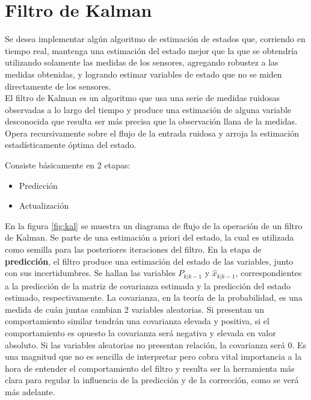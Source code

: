 \documentclass[main]{subfiles}
\begin{document}
\chapter{Filtro de Kalman}
\label{chap:kalman}

Se desea implementar algún algoritmo de estimación de estados que, corriendo en tiempo real, mantenga una estimación del estado mejor que la que se obtendría utilizando solamente las medidas de los sensores, agregando robustez a las medidas obtenidas, y logrando estimar variables de estado que no se miden directamente de los sensores.\\

El filtro de Kalman es un algoritmo que usa una serie de medidas ruidosas observadas a lo largo del tiempo y produce una estimación de alguna variable desconocida que resulta ser más precisa que la observación llana de la medidas. Opera recursivamente sobre el flujo de la entrada ruidosa y arroja la estimación estadísticamente óptima del estado.

Consiste básicamente en 2 etapas:
\begin{itemize}
  \item Predicción
  \item Actualización
\end{itemize}

En la figura \ref{fig:kal} se muestra un diagrama de flujo de la operación de un filtro de Kalman. Se parte de una estimación a priori del estado, la cual es utilizada como semilla para las posteriores iteraciones del filtro. En la etapa de \textbf{predicción}, el filtro produce una estimación del estado de las variables, junto con sus incertidumbres. Se hallan las variables $P_{k|k-1}$ y $\hat{x}_{k|k-1}$, correspondientes a la predicción de la matriz de covarianza estimada y la predicción del estado estimado, respectivamente. La covarianza, en la teoría de la probabilidad, es una medida de cuán juntas cambian 2 variables aleatorias. Si presentan un comportamiento similar tendrán una covarianza elevada y positiva, si el comportamiento es opuesto la covarianza será negativa y elevada en valor absoluto. Si las variables aleatorias no presentan relación, la covarianza será 0. Es una magnitud que no es sencilla de interpretar pero cobra vital importancia a la hora de entender el comportamiento del filtro y resulta ser la herramienta más clara para regular la influencia de la predicción y de la corrección, como se verá más adelante.\\
\end{document}
